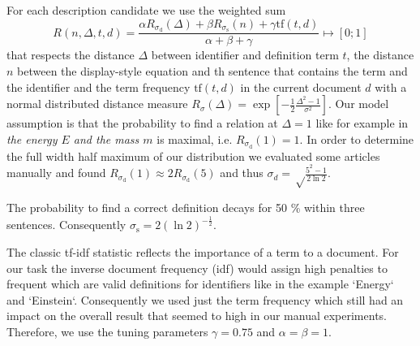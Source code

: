 \documentclass[runningheads]{llncs}
\begin{document}
For each description candidate we use the weighted sum
\begin{equation} \label{eq:rating}
	R(n,\Delta,t,d)=\frac{\alpha{R}_{\sigma_\mathrm d}(\Delta)
		+\beta{R}_{\sigma_\mathrm s}(n)
		+\gamma\mathrm{tf}(t,d)}{\alpha+\beta+\gamma} \mapsto [0;1]
\end{equation}
that respects the distance $\Delta$ between identifier and definition term $t$, the distance $n$ between the display-style equation and th sentence that contains the term and the identifier and the term frequency $\mathrm{tf}(t,d)$ in the current document $d$ 
with a normal distributed distance measure $R_\sigma(\Delta)= \exp\left[-\frac{1}{2}\frac{\Delta^2-1}{\sigma^2}\right].$
Our model assumption is that the probability to find a relation at $\Delta=1$ like for example in \emph{the energy $E$ and the mass $m$} is maximal, i.e. $R_{\sigma_\mathrm d}(1)=1$.  In order to determine the full width half maximum of our distribution we evaluated some articles manually and found $R_{\sigma_\mathrm d}(1)\approx 2 R_{\sigma_\mathrm d}(5)$ and thus $\sigma_d=\sqrt\frac{5^2-1}{2\ln 2}$.

The probability to find a correct definition decays for 50 \% within three sentences. Consequently  $\sigma_\mathrm s=2\left({\ln 2}\right)^{-\frac{1}{2}}$.

The classic tf-idf \cite{Salton86} statistic reflects the importance of a term to a document. For our task the inverse document frequency (idf)  would assign high penalties to frequent which are valid definitions for identifiers like in the example `Energy` and `Einstein`. Consequently we used just the term frequency which still had an impact on the overall result that seemed to high in our manual experiments. Therefore, we use the tuning parameters $\gamma=0.75$ and $\alpha = \beta = 1$.


%
%
%
%
\end{document}
